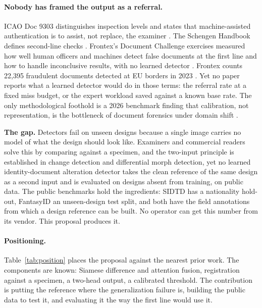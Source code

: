 \documentclass[11pt,a4paper]{article}
\begin{document}
\paragraph{Nobody has framed the output as a referral.} ICAO Doc 9303 distinguishes inspection levels and states that machine-assisted authentication is to assist, not replace, the examiner \cite{icao9303p2}. The Schengen Handbook defines second-line checks \cite{eu2022handbook}. Frontex's Document Challenge exercises measured how well human officers and machines detect false documents at the first line and how to handle inconclusive results, with no learned detector \cite{gariup2019firstline}. Frontex counts 22,395 fraudulent documents detected at EU borders in 2023 \cite{frontex2023ara}. Yet no paper reports what a learned detector would do in those terms: the referral rate at a fixed miss budget, or the expert workload saved against a known base rate. The only methodological foothold is a 2026 benchmark finding that calibration, not representation, is the bottleneck of document forensics under domain shift \cite{docforge2026}.

\begin{keybox}
\noindent\textbf{The gap.} Detectors fail on unseen designs because a single image carries no model of what the design should look like. Examiners and commercial readers solve this by comparing against a specimen, and the two-input principle is established in change detection and differential morph detection, yet no learned identity-document alteration detector takes the clean reference of the same design as a second input and is evaluated on designs absent from training, on public data. The public benchmarks hold the ingredients: SIDTD has a nationality hold-out, FantasyID an unseen-design test split, and both have the field annotations from which a design reference can be built. No operator can get this number from its vendor. This proposal produces it.
\end{keybox}

\paragraph{Positioning.} Table~\ref{tab:position} places the proposal against the nearest prior work. The components are known: Siamese difference and attention fusion, registration against a specimen, a two-head output, a calibrated threshold. The contribution is putting the reference where the generalization failure is, building the public data to test it, and evaluating it the way the first line would use it.
\end{document}
